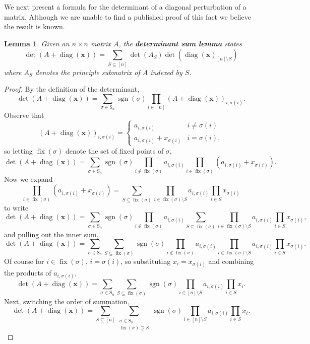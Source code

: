\documentclass{article}
\newcommand{\diag}{\operatorname{diag}}
\newcommand{\fix}{\operatorname{fix}}
\newcommand{\sgn}{\operatorname{sgn}}
\newcommand{\Sn}{{\text{S}_n}}
\theoremstyle{theorem}
\newtheorem{lem}[thm]{Lemma}
\theoremstyle{definition}
\begin{document}
We next present a formula for the determinant of a diagonal perturbation of a matrix. Although we are unable to find a published proof of this fact we believe the result is known.

\begin{lem}
    Given an $n\times n$ matrix $A$, the \textbf{determinant sum lemma} states
    \[
        \det(A+\diag(\boldsymbol{x}))=\sum_{S\subseteq[n]}\det(A_{S})\det(\diag(\boldsymbol{x})_{[n]\setminus S})
    \]
    where $A_S$ denotes the principle submatrix of $A$ indexed by $S$.
\end{lem}

\begin{proof}
    By the definition of the determinant,
    \[
        \det(A+\diag(\boldsymbol{x}))=\sum_{\sigma\in\Sn}\sgn(\sigma)\prod_{i\in[n]}(A+\diag(\boldsymbol{x}))_{i,\sigma(i)}.
    \]
    Observe that
    \[
        (A+\diag(\boldsymbol{x}))_{i,\sigma(i)}=
        \begin{cases}
            a_{i,\sigma(i)} & i\neq \sigma(i) \\
            a_{i,\sigma(i)}+x_{\sigma(i)} & i=\sigma(i),
        \end{cases}
    \]
    so letting $\fix(\sigma)$ denote the set of fixed points of $\sigma$,
    \[
        \det(A+\diag(\boldsymbol{x}))=\sum_{\sigma\in\Sn}\sgn(\sigma)\prod_{i\not\in \fix(\sigma)}a_{i,\sigma(i)}\prod_{i\in\fix(\sigma)}(a_{i,\sigma(i)}+x_{\sigma(i)}).
    \]
    Now we expand
    \[
        \prod_{i\in\fix(\sigma)}(a_{i,\sigma(i)}+x_{\sigma(i)})=\sum_{S\subseteq\fix(\sigma)}\prod_{i\in\fix(\sigma)\setminus S}a_{i,\sigma(i)}\prod_{i\in S}x_{\sigma(i)}
    \]
    to write
    \[
        \det(A+\diag(\boldsymbol{x}))=\sum_{\sigma\in\Sn}\sgn(\sigma)\prod_{i\not\in \fix(\sigma)}a_{i,\sigma(i)}\sum_{S\subseteq\fix(\sigma)}\prod_{i\in\fix(\sigma)\setminus S}a_{i,\sigma(i)}\prod_{i\in S}x_{\sigma(i)},
    \]
    and pulling out the inner sum,
    \[
        \det(A+\diag(\boldsymbol{x}))=\sum_{\sigma\in\Sn}\sum_{S\subseteq\fix(\sigma)}\sgn(\sigma)\prod_{i\not\in \fix(\sigma)}a_{i,\sigma(i)}\prod_{i\in\fix(\sigma)\setminus S}a_{i,\sigma(i)}\prod_{i\in S}x_{\sigma(i)}.
    \]
    Of course for $i\in\fix(\sigma)$, $i=\sigma(i)$, so substituting $x_i=x_{\sigma(i)}$ and combining the products of $a_{i,\sigma(i)}$,
    \[
        \det(A+\diag(\boldsymbol{x}))=\sum_{\sigma\in\Sn}\sum_{S\subseteq\fix(\sigma)}\sgn(\sigma)\prod_{i\in[n]\setminus S}a_{i,\sigma(i)}\prod_{i\in S}x_i.
    \]
    Next, switching the order of summation,
    \[
        \det(A+\diag(\boldsymbol{x}))=\sum_{S\subseteq[n]}\sum_{\substack{\sigma\in\Sn\\\fix(\sigma)\supseteq S}}\sgn(\sigma)\prod_{i\in[n]\setminus S}a_{i,\sigma(i)}\prod_{i\in S}x_i.
\]
\end{proof}
\end{document}
